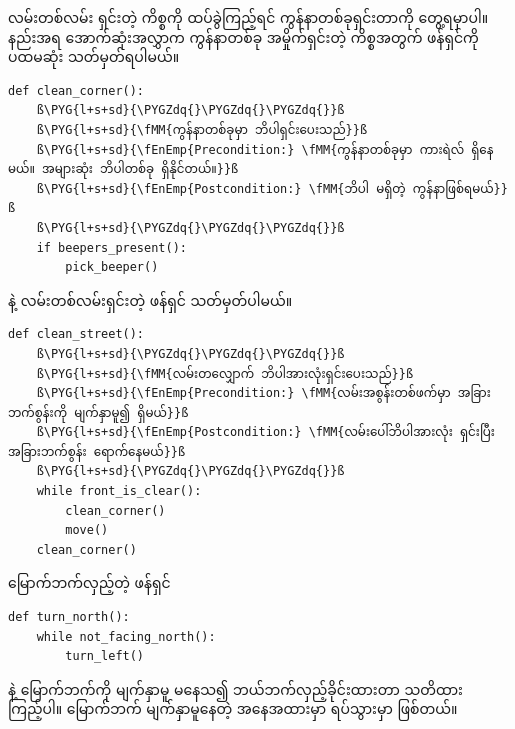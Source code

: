 လမ်းတစ်လမ်း ရှင်းတဲ့ ကိစ္စကို ထပ်ခွဲကြည့်ရင် ကွန်နာတစ်ခုရှင်းတာကို တွေ့ရမှာပါ။  နည်းအရ အောက်ဆုံးအလွှာက ကွန်နာတစ်ခု အမှိုက်ရှင်းတဲ့ ကိစ္စအတွက် ဖန်ရှင်ကို ပထမဆုံး သတ်မှတ်ရပါမယ်။
%
\setlength{\fboxsep}{0pt}
\begin{verbatim}
def clean_corner():
    ß\PYG{l+s+sd}{\PYGZdq{}\PYGZdq{}\PYGZdq{}}ß
    ß\PYG{l+s+sd}{\fMM{ကွန်နာတစ်ခုမှာ ဘိပါရှင်းပေးသည်}}ß
    ß\PYG{l+s+sd}{\fEnEmp{Precondition:} \fMM{ကွန်နာတစ်ခုမှာ ကားရဲလ် ရှိနေမယ်။ အများဆုံး ဘိပါတစ်ခု ရှိနိုင်တယ်။}}ß
    ß\PYG{l+s+sd}{\fEnEmp{Postcondition:} \fMM{ဘိပါ မရှိတဲ့ ကွန်နာဖြစ်ရမယ်}}ß
    ß\PYG{l+s+sd}{\PYGZdq{}\PYGZdq{}\PYGZdq{}}ß
    if beepers_present():
        pick_beeper()
\end{verbatim}
%
 နဲ့ လမ်းတစ်လမ်းရှင်းတဲ့ ဖန်ရှင် သတ်မှတ်ပါမယ်။
%
\setlength{\fboxsep}{0pt}
\begin{verbatim}
def clean_street():
    ß\PYG{l+s+sd}{\PYGZdq{}\PYGZdq{}\PYGZdq{}}ß
    ß\PYG{l+s+sd}{\fMM{လမ်းတလျှောက် ဘိပါအားလုံးရှင်းပေးသည်}}ß
    ß\PYG{l+s+sd}{\fEnEmp{Precondition:} \fMM{လမ်းအစွန်းတစ်ဖက်မှာ အခြားဘက်စွန်းကို မျက်နှာမူ၍ ရှိမယ်}}ß
    ß\PYG{l+s+sd}{\fEnEmp{Postcondition:} \fMM{လမ်းပေါ်ဘိပါအားလုံး ရှင်းပြီး အခြားဘက်စွန်း ရောက်နေမယ်}}ß
    ß\PYG{l+s+sd}{\PYGZdq{}\PYGZdq{}\PYGZdq{}}ß
    while front_is_clear():
        clean_corner()
        move()
    clean_corner()
\end{verbatim}
%
မြောက်ဘက်လှည့်တဲ့ ဖန်ရှင်
%
\setlength{\fboxsep}{0pt}
\begin{verbatim}
def turn_north():
    while not_facing_north():
        turn_left()
\end{verbatim}
%
  နဲ့ မြောက်ဘက်ကို မျက်နှာမူ မနေသ၍ ဘယ်ဘက်လှည့်ခိုင်းထားတာ သတိထားကြည့်ပါ။ မြောက်ဘက် မျက်နှာမူနေတဲ့ အနေအထားမှာ ရပ်သွားမှာ ဖြစ်တယ်။


